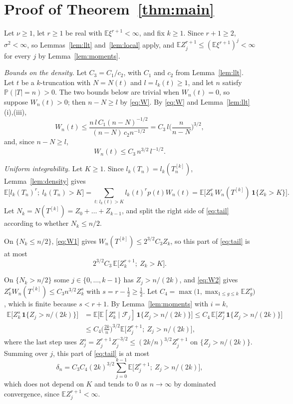 \documentclass[11pt]{amsart}
\theoremstyle{remark}
\numberwithin{equation}{section}
\newcommand{\Pp}{\mathbb P}
\newcommand{\E}{\mathbb E}
\newcommand{\cF}{\mathcal F}
\newcommand{\one}{\mathbf 1}
\begin{document}
\section{Proof of Theorem~\ref{thm:main}}\label{sec:proof}

Let $\nu\ge1$, let $r\ge1$ be real with $\E\xi^{r+1}<\infty$, and fix $k\ge1$. Since $r+1\ge2$, $\sigma^2<\infty$, so Lemmas~\ref{lem:llt} and~\ref{lem:local} apply, and $\E Z_j^{r+1}\le(\E\xi^{r+1})^j<\infty$ for every $j$ by Lemma~\ref{lem:moments}.

\emph{Bounds on the density.} Let $C_3=C_1/c_2$, with $C_1$ and $c_2$ from Lemma~\ref{lem:llt}. Let $t$ be a $k$-truncation with $N=N(t)$ and $l=l_k(t)\ge1$, and let $n$ satisfy $\Pp(|T|=n)>0$. The two bounds below are trivial when $W_n(t)=0$, so suppose $W_n(t)>0$; then $n-N\ge l$ by \eqref{eq:W}. By \eqref{eq:W} and Lemma~\ref{lem:llt}(i),(iii),
\begin{equation}\label{eq:W1}
W_n(t)\le\frac{n\,l\,C_1(n-N)^{-1/2}}{(n-N)\,c_2n^{-1/2}}=C_3\,l\Big(\frac n{n-N}\Big)^{3/2},
\end{equation}
and, since $n-N\ge l$,
\begin{equation}\label{eq:W2}
W_n(t)\le C_3\,n^{3/2}\,l^{-1/2}.
\end{equation}

\emph{Uniform integrability.} Let $K\ge1$. Since $l_k(T_n)=l_k(T_n^{[k]})$, Lemma~\ref{lem:density} gives
\begin{equation}\label{eq:tail}
\E\big[l_k(T_n)^r;\ l_k(T_n)>K\big]=\sum_{t:\,l_k(t)>K}l_k(t)^rp(t)W_n(t)=\E\big[Z_k^r\,W_n(T^{[k]})\,\one\{Z_k>K\}\big].
\end{equation}
Let $N_k=N(T^{[k]})=Z_0+\dots+Z_{k-1}$, and split the right side of \eqref{eq:tail} according to whether $N_k\le n/2$.

On $\{N_k\le n/2\}$, \eqref{eq:W1} gives $W_n(T^{[k]})\le2^{3/2}C_3Z_k$, so this part of \eqref{eq:tail} is at most
\begin{equation}\label{eq:partA}
2^{3/2}C_3\,\E\big[Z_k^{r+1};\ Z_k>K\big].
\end{equation}

On $\{N_k>n/2\}$ some $j\in\{0,\dots,k-1\}$ has $Z_j>n/(2k)$, and \eqref{eq:W2} gives $Z_k^rW_n(T^{[k]})\le C_3n^{3/2}Z_k^{s}$ with $s=r-\frac12\ge\frac12$. Let $C_4=\max\big(1,\max_{1\le g\le k}\E Z_g^s\big)$, which is finite because $s<r+1$. By Lemma~\ref{lem:moments} with $i=k$,
\begin{align*}
\E\big[Z_k^s\,\one\{Z_j>n/(2k)\}\big]&=\E\big[\E[Z_k^s\mid\cF_j]\,\one\{Z_j>n/(2k)\}\big]\le C_4\,\E\big[Z_j^s\,\one\{Z_j>n/(2k)\}\big]\\
&\le C_4\Big(\frac{2k}n\Big)^{3/2}\E\big[Z_j^{r+1};\ Z_j>n/(2k)\big],
\end{align*}
where the last step uses $Z_j^s=Z_j^{r+1}Z_j^{-3/2}\le(2k/n)^{3/2}Z_j^{r+1}$ on $\{Z_j>n/(2k)\}$. Summing over $j$, this part of \eqref{eq:tail} is at most
\begin{equation}\label{eq:partB}
\delta_n=C_3C_4(2k)^{3/2}\sum_{j=0}^{k-1}\E\big[Z_j^{r+1};\ Z_j>n/(2k)\big],
\end{equation}
which does not depend on $K$ and tends to $0$ as $n\to\infty$ by dominated convergence, since $\E Z_j^{r+1}<\infty$.
\end{document}
